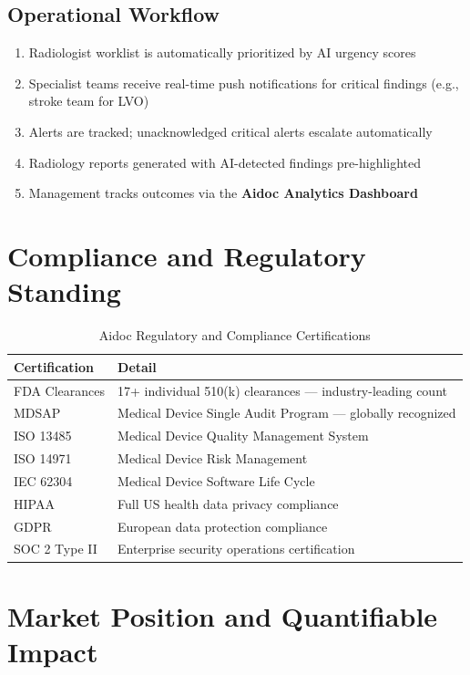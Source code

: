 \documentclass[12pt,a4paper]{article}
\begin{document}
\subsection{Operational Workflow}
\begin{enumerate}[noitemsep]
    \item Radiologist worklist is automatically prioritized by AI urgency scores
    \item Specialist teams receive real-time push notifications for critical findings (e.g., stroke team for LVO)
    \item Alerts are tracked; unacknowledged critical alerts escalate automatically
    \item Radiology reports generated with AI-detected findings pre-highlighted
    \item Management tracks outcomes via the \textbf{Aidoc Analytics Dashboard}
\end{enumerate}

\section{Compliance and Regulatory Standing}

\begin{table}[H]\centering\renewcommand{\arraystretch}{1.4}
\begin{tabularx}{\textwidth}{lX}\toprule
\textbf{Certification} & \textbf{Detail}\\\midrule
FDA Clearances & 17+ individual 510(k) clearances --- industry-leading count \\
MDSAP          & Medical Device Single Audit Program --- globally recognized \\
ISO 13485      & Medical Device Quality Management System \\
ISO 14971      & Medical Device Risk Management \\
IEC 62304      & Medical Device Software Life Cycle \\
HIPAA          & Full US health data privacy compliance \\
GDPR           & European data protection compliance \\
SOC 2 Type II  & Enterprise security operations certification \\
\bottomrule\end{tabularx}\caption{Aidoc Regulatory and Compliance Certifications}\end{table}

\section{Market Position and Quantifiable Impact}
\end{document}
